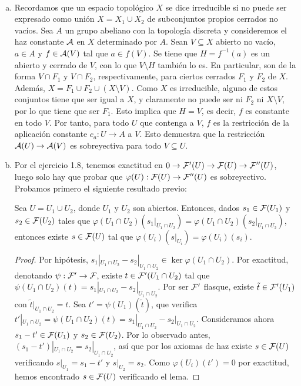 \documentclass[twoside]{article}
\begin{document}
\begin{solucion}\
\begin{enumerate}[(a)]
\item Recordamos que un espacio topológico $X$ se dice irreducible si no puede ser expresado como unión $X=X_1\cup X_2$ de subconjuntos propios cerrados no vacíos. Sea $A$ un grupo abeliano con la topología discreta y consideremos el haz constante $\mathcal{A}$ en $X$ determinado por $A$. Sean $V\subseteq X$ abierto no vacío, $a\in A$ y $f\in\mathcal{A}(V)$ tal que $a\in f(V)$. Se tiene que $H=f^{-1}(a)$ es un abierto y cerrado de $V$, con lo que $V\setminus H$ también lo es. En particular, son de la forma $V\cap F_1$ y $V\cap F_2$, respectivamente, para ciertos cerrados $F_1$ y $F_2$ de $X$. Además, $X=F_1\cup F_2\cup (X\setminus V)$. Como $X$ es irreducible, alguno de estos conjuntos tiene que ser igual a $X$, y claramente no puede ser ni $F_2$ ni $X\setminus V$, por lo que tiene que ser $F_1$. Esto implica que $H=V$, es decir, $f$ es constante en todo $V$. Por tanto, para todo $U$ que contenga a $V$, $f$ es la restricción de la aplicación constante $c_a:U\to A$ a $V$. Esto demuestra que la restricción $\mathcal{A}(U)\to\mathcal{A}(V)$ es sobreyectiva para todo $V\subseteq U$.

\item Por el ejercicio 1.8, tenemos exactitud en $0\to\mathcal{F}'(U)\to\mathcal{F}(U)\to\mathcal{F}''(U)$, luego solo hay que probar que $\varphi(U):\mathcal{F}(U)\to\mathcal{F}''(U)$ es sobreyectivo. Probamos primero el siguiente resultado previo:
\begin{lemma}
Sea $U=U_1\cup U_2$, donde $U_1$ y $U_2$ son abiertos. Entonces, dados $s_1\in\mathcal{F}(U_1)$ y $s_2\in\mathcal{F}(U_2)$ tales que $\varphi(U_1\cap U_2)(s_1|_{U_1\cap U_2})=\varphi(U_1\cap U_2)(s_2|_{U_1\cap U_2})$, entonces existe $s\in\mathcal{F}(U)$ tal que $\varphi(U_i)(s|_{U_i})=\varphi(U_i)(s_i)$. 
\end{lemma}
\begin{proof}
Por hipótesis, $s_1|_{U_1\cap U_2}-s_2|_{U_1\cap U_2}\in\ker\varphi(U_1\cap U_2)$. Por exactitud, denotando $\psi:\mathcal{F}'\to\mathcal{F}$, existe $t\in\mathcal{F}'(U_1\cap U_2)$ tal que $\psi(U_1\cap U_2)(t)=s_1|_{U_1\cap U_2}-s_2|_{U_1\cap U_2}$. Por ser $\mathcal{F}'$ flasque, existe $\tilde{t}\in\mathcal{F}'(U_1)$ con $\tilde{t}|_{U_1\cap U_2}=t$. Sea $t'=\psi(U_1)(\tilde{t})$, que verifica $t'|_{U_1\cap U_2}=\psi(U_1\cap U_2)(t)=s_1|_{U_1\cap U_2}-s_2|_{U_1\cap U_2}$. Consideramos ahora $s_1-t'\in\mathcal{F}(U_1)$ y $s_2\in\mathcal{F}(U_2)$. Por lo observado antes, $(s_1-t')|_{U_1\cap U_2}=s_2|_{U_1\cap U_2}$, así que por los axiomas de haz existe $s\in\mathcal{F}(U)$ verificando $s|_{U_1}=s_1-t'$ y $s|_{U_2}=s_2$. Como $\varphi(U_i)(t')=0$ por exactitud, hemos encontrado $s\in\mathcal{F}(U)$ verificando el lema. 
\end{proof}


\end{enumerate}
\end{solucion}
\end{document}
